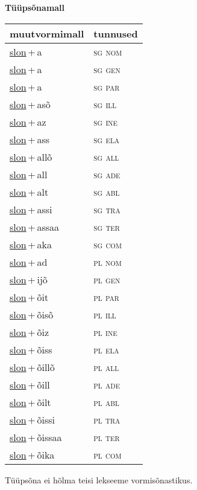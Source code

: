 
\vspace{1.8em}
\begin{minipage}{\textwidth}
\textbf{Tüüpsõnamall \,}\\

\begin{sideways}
\begin{tabular}{l l}
muutvormimall & tunnused \\
\hline
\underline{slon}\,+\,a & \textsc{ sg nom } \\
\underline{slon}\,+\,a & \textsc{ sg gen } \\
\underline{slon}\,+\,a & \textsc{ sg par } \\
\underline{slon}\,+\,asõ & \textsc{ sg ill } \\
\underline{slon}\,+\,az & \textsc{ sg ine } \\
\underline{slon}\,+\,ass & \textsc{ sg ela } \\
\underline{slon}\,+\,allõ & \textsc{ sg all } \\
\underline{slon}\,+\,all & \textsc{ sg ade } \\
\underline{slon}\,+\,alt & \textsc{ sg abl } \\
\underline{slon}\,+\,assi & \textsc{ sg tra } \\
\underline{slon}\,+\,assaa & \textsc{ sg ter } \\
\underline{slon}\,+\,aka & \textsc{ sg com } \\
\underline{slon}\,+\,ad & \textsc{ pl nom } \\
\underline{slon}\,+\,ijõ & \textsc{ pl gen } \\
\underline{slon}\,+\,õit & \textsc{ pl par } \\
\underline{slon}\,+\,õisõ & \textsc{ pl ill } \\
\underline{slon}\,+\,õiz & \textsc{ pl ine } \\
\underline{slon}\,+\,õiss & \textsc{ pl ela } \\
\underline{slon}\,+\,õillõ & \textsc{ pl all } \\
\underline{slon}\,+\,õill & \textsc{ pl ade } \\
\underline{slon}\,+\,õilt & \textsc{ pl abl } \\
\underline{slon}\,+\,õissi & \textsc{ pl tra } \\
\underline{slon}\,+\,õissaa & \textsc{ pl ter } \\
\underline{slon}\,+\,õika & \textsc{ pl com } \\
\end{tabular}
\end{sideways}
\label{tab:tüüpsõnamall-slona}

\end{minipage}

 
\vspace{1em}
\noindent Tüüpsõna ei hõlma teisi lekseeme vormi\-sõnastikus.
